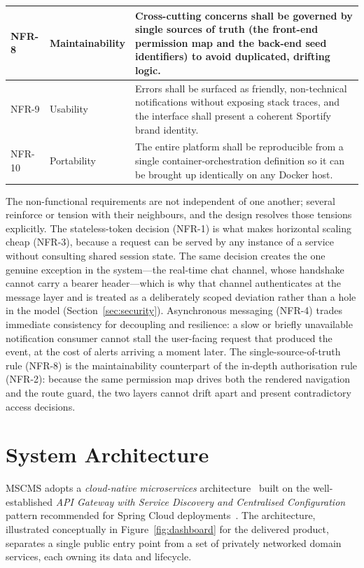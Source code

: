 \begin{table}[htbp]
\begin{tabular}{|p{}|p{}|p{}|}
\hline
NFR-8 & Maintainability & Cross-cutting concerns shall be governed by single sources of truth (the front-end permission map and the back-end seed identifiers) to avoid duplicated, drifting logic. \\
\hline
NFR-9 & Usability & Errors shall be surfaced as friendly, non-technical notifications without exposing stack traces, and the interface shall present a coherent Sportify brand identity. \\
\hline
NFR-10 & Portability & The entire platform shall be reproducible from a single container-orchestration definition so it can be brought up identically on any Docker host. \\
\hline
\end{tabular}
\end{table}

The non-functional requirements are not independent of one another; several reinforce
or tension with their neighbours, and the design resolves those tensions explicitly.
The stateless-token decision (NFR-1) is what makes horizontal scaling cheap (NFR-3),
because a request can be served by any instance of a service without consulting shared
session state. The same decision creates the one genuine exception in the system---the
real-time chat channel, whose handshake cannot carry a bearer header---which is why
that channel authenticates at the message layer and is treated as a deliberately
scoped deviation rather than a hole in the model (Section~\ref{sec:security}).
Asynchronous messaging (NFR-4) trades immediate consistency for decoupling and
resilience: a slow or briefly unavailable notification consumer cannot stall the
user-facing request that produced the event, at the cost of alerts arriving a moment
later. The single-source-of-truth rule (NFR-8) is the maintainability counterpart of
the in-depth authorisation rule (NFR-2): because the same permission map drives both
the rendered navigation and the route guard, the two layers cannot drift apart and
present contradictory access decisions.

\section{System Architecture}
\label{sec:architecture}

MSCMS adopts a \emph{cloud-native microservices} architecture~\cite{microservices}
built on the well-established \emph{API Gateway with Service Discovery and Centralised
Configuration} pattern recommended for Spring Cloud deployments~\cite{springcloud}.
The architecture, illustrated conceptually in Figure~\ref{fig:dashboard} for the
delivered product, separates a single public entry point from a set of privately
networked domain services, each owning its data and lifecycle.

